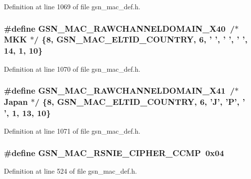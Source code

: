 Definition at line 1069 of file gsn\_\-mac\_\-def.h.

\hypertarget{a00642_ga438fdc847fa4e621ec8496edb440b33d}{
\subsubsection[{GSN\_\-MAC\_\-RAWCHANNELDOMAIN\_\-X40}]{\setlength{\rightskip}{0pt plus 5cm}\#define GSN\_\-MAC\_\-RAWCHANNELDOMAIN\_\-X40~/$\ast$ MKK    $\ast$/ \{8, GSN\_\-MAC\_\-ELTID\_\-COUNTRY, 6, ' ', ' ', ' ', 14, 1, 10\}}}
\label{a00642_ga438fdc847fa4e621ec8496edb440b33d}


Definition at line 1070 of file gsn\_\-mac\_\-def.h.

\hypertarget{a00642_gad8ce3e93cc664b42d72189d4cbec214c}{
\subsubsection[{GSN\_\-MAC\_\-RAWCHANNELDOMAIN\_\-X41}]{\setlength{\rightskip}{0pt plus 5cm}\#define GSN\_\-MAC\_\-RAWCHANNELDOMAIN\_\-X41~/$\ast$ Japan  $\ast$/ \{8, GSN\_\-MAC\_\-ELTID\_\-COUNTRY, 6, 'J', 'P', ' ', 1, 13, 10\}}}
\label{a00642_gad8ce3e93cc664b42d72189d4cbec214c}


Definition at line 1071 of file gsn\_\-mac\_\-def.h.

\hypertarget{a00642_gae128a6f53a21ed1dd5cc751f5f76b063}{
\subsubsection[{GSN\_\-MAC\_\-RSNIE\_\-CIPHER\_\-CCMP}]{\setlength{\rightskip}{0pt plus 5cm}\#define GSN\_\-MAC\_\-RSNIE\_\-CIPHER\_\-CCMP~0x04}}
\label{a00642_gae128a6f53a21ed1dd5cc751f5f76b063}


Definition at line 524 of file gsn\_\-mac\_\-def.h.

